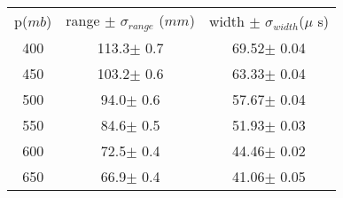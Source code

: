 
\begin{center}
\begin{tabulary}{\textwidth}{CCC}
\toprule
 p($mb$)& range $\pm$ $\sigma_{range}$ ($mm$) &  width $\pm$ $\sigma_{width}$($\mu$ s)\\
400&	113.3$\pm$	0.7&	69.52$\pm$	0.04\\
450&	103.2$\pm$	0.6&	63.33$\pm$	0.04\\
500&	94.0$\pm$	0.6&	57.67$\pm$	0.04\\
550&	84.6$\pm$	0.5&	51.93$\pm$	0.03\\
600&	72.5$\pm$	0.4&	44.46$\pm$	0.02\\
650&	66.9$\pm$	0.4&	41.06$\pm$	0.05\\
\bottomrule
\end{tabulary}
\end{center}



